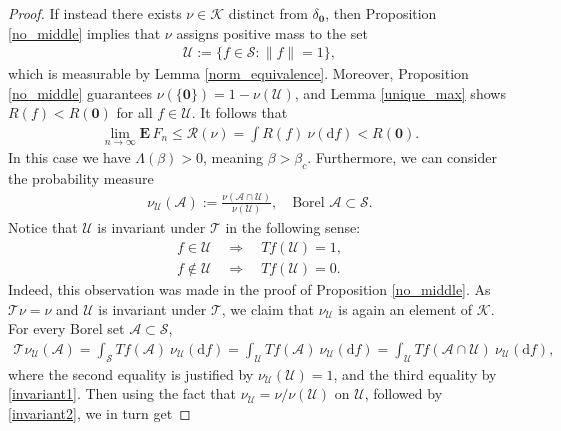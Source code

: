 \documentclass[11pt,reqno]{amsart}
\numberwithin{equation}{section}
\theoremstyle{definition}
\begin{document}
\begin{proof}
If instead there exists $\nu \in {\mathcal{K}}$ distinct from $\delta_{{\boldsymbol {0}}}$, then Proposition \ref{no_middle} implies that $\nu$ assigns positive mass to the set
{\begin{align*} {
{\mathcal{U}} := \{f \in {\mathcal{S}} : \|f\| = 1\}, 
} \end{align*}}
which is measurable by Lemma \ref{norm_equivalence}.
Moreover, Proposition \ref{no_middle} guarantees $\nu(\{{{\boldsymbol {0}}}\}) = 1 - \nu({\mathcal{U}})$,
and Lemma \ref{unique_max} shows $R(f) < R({{\boldsymbol {0}}})$ for all $f \in {\mathcal{U}}$.
It follows that
{\begin{align*} {
\lim_{n \to \infty} {\mathbf{E}}\, F_n \leq {\mathcal{R}}(\nu) = \int R(f)\ \nu({\mathrm{d}} f) < R({{\boldsymbol {0}}}).
} \end{align*}}
In this case we have $\Lambda(\beta) > 0$, meaning $\beta > \beta_c$.
Furthermore, we can consider the probability measure
{\begin{align*} {
\nu_{\mathcal{U}}({\mathcal{A}}) := \frac{\nu({\mathcal{A}} \cap {\mathcal{U}})}{\nu({\mathcal{U}})}, \quad \text{Borel } {\mathcal{A}} \subset {\mathcal{S}}.
} \end{align*}}
Notice that ${\mathcal{U}}$ is invariant under ${\mathcal{T}}$ in the following sense:
\begin{align}
f \in {\mathcal{U}} \quad \Rightarrow \quad Tf({\mathcal{U}}) = 1, \label{invariant1} \\
f \notin {\mathcal{U}} \quad \Rightarrow \quad Tf({\mathcal{U}})  = 0. \label{invariant2}
\end{align}
Indeed, this observation was made in the proof of Proposition \ref{no_middle}.
As ${\mathcal{T}}\nu = \nu$ and ${\mathcal{U}}$ is invariant under ${\mathcal{T}}$, we claim that $\nu_{\mathcal{U}}$ is again an element of ${\mathcal{K}}$.
For every Borel set ${\mathcal{A}} \subset {\mathcal{S}}$,
{\begin{align*} {
{\mathcal{T}}\nu_{\mathcal{U}}({\mathcal{A}})
= \int_{\mathcal{S}} Tf({\mathcal{A}})\ \nu_{\mathcal{U}}({\mathrm{d}} f)
= \int_{\mathcal{U}}  Tf({\mathcal{A}})\ \nu_{\mathcal{U}}({\mathrm{d}} f)
= \int_{\mathcal{U}}  Tf({\mathcal{A}}\cap {\mathcal{U}})\ \nu_{\mathcal{U}}({\mathrm{d}} f),
} \end{align*}}
where the second equality is justified by $\nu_{\mathcal{U}}({\mathcal{U}}) = 1$, and the third equality by \eqref{invariant1}.
Then using the fact that $\nu_{\mathcal{U}} = \nu/\nu({\mathcal{U}})$ on ${\mathcal{U}}$, followed by \eqref{invariant2}, we in turn get

\end{proof}
\end{document}
